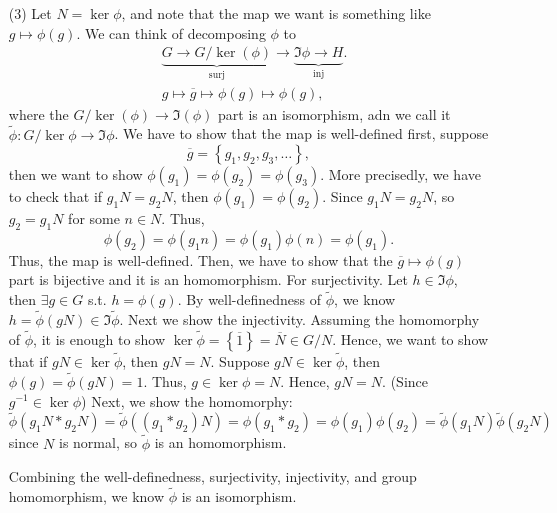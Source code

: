 \begin{explanation}
\begin{itemize}
        \item [(3)] Let \(N = \ker \phi \), and note that the map we want is something like \(g \mapsto \phi(g)\). We can think of decomposing \(\phi \) to  
        \begin{align*}
            &\underbrace{G \to G / \ker (\phi )}_{\text{surj}} \to \underbrace{\Im \phi \to H}_{\text{inj}}. \\
            &g \mapsto \overline{g} \mapsto \phi (g) \mapsto \phi (g), 
        \end{align*}
        where the \(G / \ker(\phi ) \to \Im (\phi )\) part is an isomorphism, adn we call it \(\widetilde{\phi }: G / \ker \phi \to \Im \phi  \). We have to show that the map is well-defined first, suppose 
        \[
            \overline{g} = \left\{ g_1, g_2, g_3, \dots  \right\},  
        \]then  we want to show \(\phi (g_1) = \phi (g_2) = \phi (g_3)\). More precisedly, we have to check that if \(g_1 N = g_2 N\), then \(\phi (g_1) = \phi (g_2)\). Since \(g_1 N = g_2 N\), so \(g_2 = g_1 N\) for some \(n \in N\). Thus,
        \[
            \phi (g_2) = \phi (g_1 n) = \phi (g_1) \phi (n) = \phi (g_1).
        \] Thus, the map is well-defined. Then, we have to show that the \(\overline{g} \mapsto \phi (g) \) part is bijective and it is an homomorphism. For surjectivity. Let \(h \in \Im \phi \), then \(\exists g \in G\) s.t. \(h = \phi (g)\). By well-definedness of \(\widetilde{\phi } \), we know \(h = \widetilde{\phi }(gN) \in \Im \widetilde{\phi }  \). Next we show the injectivity. Assuming the homomorphy of \(\widetilde{\phi } \), it is enough to show \(\ker \widetilde{\phi } = \left\{ \overline{1}  \right\} = \overline{N} \in G / N  \). Hence, we want to show that if \(gN \in \ker \widetilde{\phi } \), then \(gN=N\). Suppose \(gN \in \ker \widetilde{\phi } \), then \(\phi (g) = \widetilde{\phi }(gN) = 1 \). Thus, \(g \in \ker \phi = N\). Hence, \(gN = N\). (Since \(g^{-1} \in \ker \phi  \)) Next, we show the homomorphy: 
        \[
            \widetilde{\phi }(g_1 N * g_2 N) = \widetilde{\phi }((g_1 * g_2)N)  = \phi (g_1 * g_2) = \phi (g_1) \phi (g_2) = \widetilde{\phi }(g_1 N) \widetilde{\phi }(g_2 N)    
        \] since \(N\) is normal,  so \(\widetilde{\phi } \) is an homomorphism. 
        
        Combining the well-definedness, surjectivity, injectivity, and group homomorphism, we know \(\widetilde{\phi } \) is an isomorphism.
    \end{itemize}
\end{explanation}

